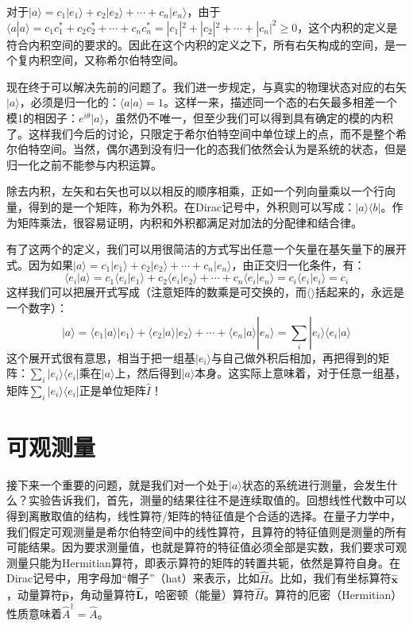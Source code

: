 \documentclass{ctexart}
\begin{document}
对于$|a\rangle=c_1|e_1\rangle+c_2|e_2\rangle+\cdots+c_n|e_n\rangle$，由于$\langle a|a\rangle=c_1c_1^*+c_2c_2^*+\cdots+c_nc_n^*=|c_1|^2+|c_2|^2+\cdots+|c_n|^2\geq 0$，这个内积的定义是符合内积空间的要求的。因此在这个内积的定义之下，所有右矢构成的空间，是一个复内积空间，又称希尔伯特空间。

现在终于可以解决先前的问题了。我们进一步规定，与真实的物理状态对应的右矢$|a\rangle$，必须是归一化的：$\langle a|a\rangle=1$。这样一来，描述同一个态的右矢最多相差一个模1的相因子：$e^{i\theta}|a\rangle$，虽然仍不唯一，但至少我们可以得到具有确定的模的内积了。这样我们今后的讨论，只限定于希尔伯特空间中单位球上的点，而不是整个希尔伯特空间。当然，偶尔遇到没有归一化的态我们依然会认为是系统的状态，但是归一化之前不能参与内积运算。

除去内积，左矢和右矢也可以以相反的顺序相乘，正如一个列向量乘以一个行向量，得到的是一个矩阵，称为外积。在Dirac记号中，外积则可以写成：$|a\rangle\langle b|$。作为矩阵乘法，很容易证明，内积和外积都满足对加法的分配律和结合律。

有了这两个的定义，我们可以用很简洁的方式写出任意一个矢量在基矢量下的展开式。因为如果$|a\rangle=c_1|e_1\rangle+c_2|e_2\rangle+\cdots+c_n|e_n\rangle$，由正交归一化条件，有：
\begin{equation}
\langle e_i|a\rangle=c_1\langle e_i|e_1\rangle+c_2\langle e_i|e_2\rangle+\cdots+c_n\langle e_i|e_n\rangle=c_i\langle e_i|e_i\rangle=c_i
\end{equation}
这样我们可以把展开式写成（注意矩阵的数乘是可交换的，而$\langle\rangle$括起来的，永远是一个数字）：
\begin{equation}
|a\rangle=\langle e_1|a\rangle|e_1\rangle+\langle e_2|a\rangle|e_2\rangle+\cdots+\langle e_n|a\rangle|e_n\rangle=\sum_i| e_i\rangle\langle e_i|a\rangle
\end{equation}
这个展开式很有意思，相当于把一组基$|e_i\rangle$与自己做外积后相加，再把得到的矩阵：$\sum_i|e_i\rangle\langle e_i|$乘在$|a\rangle$上，然后得到$|a\rangle$本身。这实际上意味着，对于任意一组基，矩阵$\sum_i|e_i\rangle\langle e_i|$正是单位矩阵$\hat{I}$！

\section{可观测量}

接下来一个重要的问题，就是我们对一个处于$|a\rangle$状态的系统进行测量，会发生什么？实验告诉我们，首先，测量的结果往往不是连续取值的。回想线性代数中可以得到离散取值的结构，线性算符/矩阵的特征值是个合适的选择。在量子力学中，我们假定可观测量是希尔伯特空间中的线性算符，且算符的特征值则是测量的所有可能结果。因为要求测量值，也就是算符的特征值必须全部是实数，我们要求可观测量只能为Hermitian算符，即表示算符的矩阵的转置共轭，依然是算符自身。在Dirac记号中，用字母加“帽子”（hat）来表示，比如$\hat{H}$。比如，我们有坐标算符$\hat{\bm{x}}$，动量算符$\hat{\bm{p}}$，角动量算符$\hat{\bm{L}}$，哈密顿（能量）算符$\hat{H}$。算符的厄密（Hermitian）性质意味着$\hat{A}^\dagger=\hat{A}$。
\end{document}

